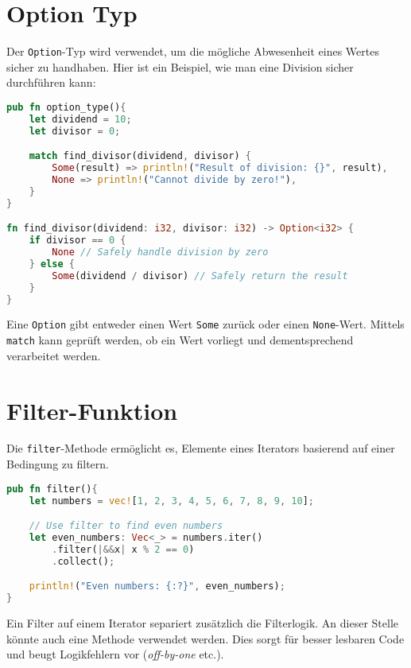 \section{Option Typ}

Der \texttt{Option}-Typ wird verwendet, um die mögliche Abwesenheit eines Wertes sicher zu handhaben. Hier ist ein Beispiel, wie man eine Division sicher durchführen kann:

\begin{lstlisting}[language=Rust, caption=Option Typ]
pub fn option_type(){
    let dividend = 10;
    let divisor = 0;

    match find_divisor(dividend, divisor) {
        Some(result) => println!("Result of division: {}", result),
        None => println!("Cannot divide by zero!"),
    }
}

fn find_divisor(dividend: i32, divisor: i32) -> Option<i32> {
    if divisor == 0 {
        None // Safely handle division by zero
    } else {
        Some(dividend / divisor) // Safely return the result
    }
}
\end{lstlisting}
\noindent
Eine \texttt{Option} gibt entweder einen Wert \texttt{Some} zurück oder einen \texttt{None}-Wert. Mittels \texttt{match} kann geprüft werden, ob ein Wert vorliegt und dementsprechend verarbeitet werden.

\section{Filter-Funktion}

Die \texttt{filter}-Methode ermöglicht es, Elemente eines Iterators basierend auf einer Bedingung zu filtern.

\begin{lstlisting}[language=Rust, caption=Filter-Funktion]
pub fn filter(){
    let numbers = vec![1, 2, 3, 4, 5, 6, 7, 8, 9, 10];

    // Use filter to find even numbers
    let even_numbers: Vec<_> = numbers.iter()
        .filter(|&&x| x % 2 == 0)
        .collect();

    println!("Even numbers: {:?}", even_numbers);
}
\end{lstlisting}
Ein Filter auf einem Iterator separiert zusätzlich die Filterlogik. 
An dieser Stelle könnte auch eine Methode verwendet werden. 
Dies sorgt für besser lesbaren Code und beugt Logikfehlern vor (\textit{\gls{off-by-one}} etc.).
